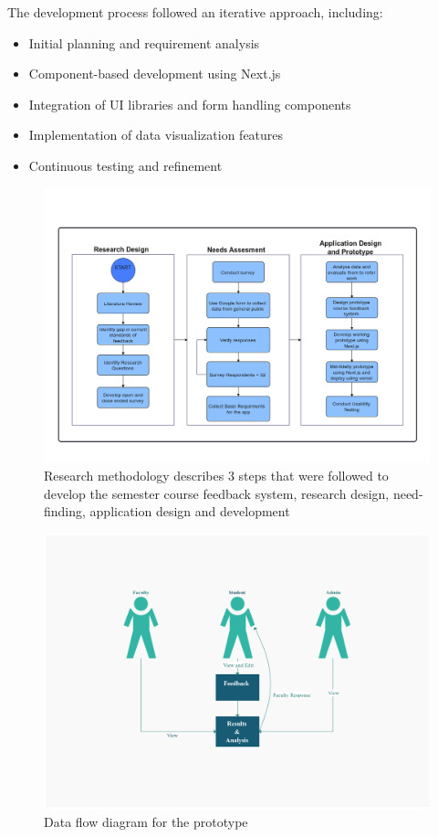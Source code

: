 \documentclass[conference]{IEEEtran}
\begin{document}
The development process followed an iterative approach, including:
\begin{itemize}
    \item Initial planning and requirement analysis
    \item Component-based development using Next.js
    \item Integration of UI libraries and form handling components
    \item Implementation of data visualization features
    \item Continuous testing and refinement
\end{itemize}

\begin{figure}[htbp]
    \centering
    \includegraphics[width=0.8\linewidth]{research_workflow.png} 
    \caption{Research methodology describes 3 steps that were followed to develop the semester course feedback system, research design, need-finding,
    application design and development}
    \label{fig:research_workflow}
\end{figure}

\begin{figure}[htbp]
    \centering
    \includegraphics[width=0.8\linewidth]{data_flow.png} 
    \caption{Data flow diagram for the prototype}
    \label{fig:data_workflow}
\end{figure}
\end{document}

